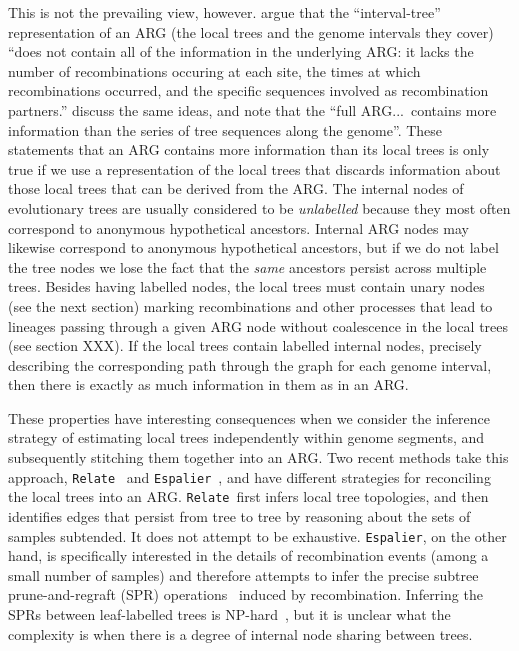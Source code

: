 \documentclass{article}
\newcommand{\relate}[0]{\texttt{Relate}}
\newcommand{\espalier}[0]{\texttt{Espalier}}
\begin{document}
This is not the prevailing view, however.
\cite{kuhner2017consensus} argue that the
``interval-tree'' representation of
an ARG (the local trees and the genome intervals they cover)
``does not contain all of the information in the underlying ARG: it lacks the
number of recombinations occuring at each site, the times at which
recombinations occurred, and the specific sequences involved as recombination
partners.''
\cite{shipilina2023origin} discuss the same ideas,
and note that the
``full ARG...~contains more information than the series of tree
sequences along the genome''.
These statements that an ARG
contains more information than its local trees is only true
if we use a representation of the local trees that discards
information about those local trees that can be derived from the ARG.
The internal nodes of evolutionary trees are usually
considered to be \emph{unlabelled}
because they most often correspond
to anonymous hypothetical ancestors.
Internal ARG nodes may likewise correspond to anonymous hypothetical
ancestors, but if we do not label the tree nodes we lose the fact that
the \emph{same} ancestors persist across multiple trees.
Besides having labelled nodes, the local trees must contain
unary nodes (see the next section) marking recombinations
and other processes that lead to lineages passing through a given
ARG node without coalescence in the local trees (see section XXX).
If the local trees contain labelled internal nodes, precisely
describing the corresponding path through the graph for each
genome interval, then there is exactly as
much information in them as in an ARG.

These properties have interesting consequences when we
consider the inference strategy of estimating local trees
independently within genome segments,
and subsequently stitching them together into an ARG.
Two recent methods take this approach,
\relate~\citep{speidel2019method} and
\espalier~\citep{rasmussen2022espalier},
and have different strategies for reconciling the local trees into an ARG.
\relate\ first infers local tree topologies, and then identifies
edges that persist from tree to tree by reasoning about the sets of samples
subtended. It does not attempt to be exhaustive.
\espalier, on the other hand, is specifically interested
in the details of recombination events (among a small number of samples)
and therefore attempts to infer
the precise subtree prune-and-regraft (SPR)
operations~\citep{hein1990reconstructing,song2003on,song2006properties}
induced by recombination.
Inferring the SPRs between leaf-labelled trees is
NP-hard~\citep{hein1996complexity,allen2001subtree,bordewich2005computational},
but it is unclear what the complexity is when there
is a degree of internal node sharing between trees.
\end{document}

